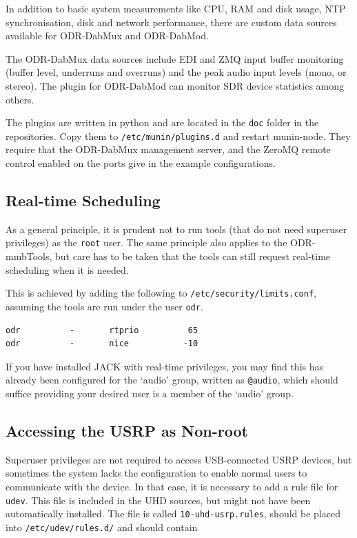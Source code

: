 In addition to basic system measurements like CPU, RAM and disk usage, NTP
synchronisation, disk and network performance, there are custom data sources
available for ODR-DabMux and ODR-DabMod.

The ODR-DabMux data sources include EDI and ZMQ input buffer monitoring (buffer
level, underruns and overruns) and the peak audio input levels (mono, or
stereo). The plugin for ODR-DabMod can monitor SDR device statistics among
others.

The plugins are written in python and are located in the \verb+doc+ folder in
the repositories. Copy them to \texttt{/etc/munin/plugins.d} and restart
munin-node. They require that the ODR-DabMux management
server, and the ZeroMQ remote control enabled on the ports give in the example
configurations.


\subsection{Real-time Scheduling}
As a general principle, it is prudent not to run tools (that do not need superuser
privileges) as the \texttt{root} user. The same principle also applies to the
ODR-mmbTools, but care has to be taken that the tools can still request real-time
scheduling when it is needed.

This is achieved by adding the following to \texttt{/etc/security/limits.conf},
assuming the tools are run under the user \texttt{odr}.

\begin{lstlisting}
odr          -       rtprio          65
odr          -       nice           -10
\end{lstlisting}

If you have installed JACK with real-time privileges, you may find this has
already been configured for the `audio' group, written as \texttt{@audio}, which
should suffice providing your desired user is a member of the `audio' group.

\subsection{Accessing the USRP as Non-root}

Superuser privileges are not required to access USB-connected USRP devices, but
sometimes the system lacks the configuration to enable normal users to
communicate with the device.
In that case, it is necessary to add a rule file for \texttt{udev}. This file is
included in the UHD sources, but might not have been automatically installed.
The file is called \texttt{10-uhd-usrp.rules}, should be placed into
\texttt{/etc/udev/rules.d/} and should contain

